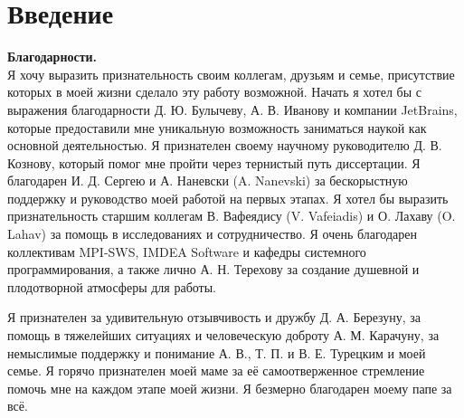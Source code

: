 \chapter*{Введение}							%

\newcommand{\actuality}{{\textbf{\actualityTXT}}}
\newcommand{\progress}{\textbf{\progressTXT}}
\newcommand{\aim}{{\textbf\aimTXT}}
\newcommand{\tasks}{\textbf{\tasksTXT}}
\newcommand{\novelty}{\textbf{\noveltyTXT}}
\newcommand{\influence}{\textbf{\influenceTXT}}
\newcommand{\methods}{\textbf{\methodsTXT}}
\newcommand{\defpositions}{\textbf{\defpositionsTXT}}
\newcommand{\reliability}{\textbf{\reliabilityTXT}}
\newcommand{\probation}{\textbf{\probationTXT}}
\newcommand{\contribution}{\textbf{\contributionTXT}}
\newcommand{\publications}{\textbf{\publicationsTXT}}

\newcommand{\ccite}[1]{\cite{#1}}
\newcommand{\cscite}[1]{~\cite{#1}}


\textbf{Благодарности.} \\
Я хочу выразить признательность своим коллегам, друзьям и семье, присутствие которых
в моей жизни сделало эту работу возможной.
Начать я хотел бы с выражения благодарности Д. Ю. Булычеву, А. В. Иванову и компании JetBrains,
которые предоставили мне уникальную возможность заниматься наукой как основной деятельностью.
Я признателен своему научному руководителю Д. В. Кознову, который помог мне пройти через тернистый путь
диссертации. 
Я благодарен И. Д. Сергею и А. Наневски (A. Nanevski) за бескорыстную поддержку и руководство
моей работой на первых этапах.
Я хотел бы выразить признательность старшим коллегам В. Вафеядису (V. Vafeiadis) и О. Лахаву (O. Lahav)
за помощь в исследованиях и сотрудничество.
Я очень благодарен коллективам MPI-SWS, IMDEA Software и кафедры системного программирования,
а также лично А. Н. Терехову за создание душевной и плодотворной атмосферы для работы.

Я признателен за удивительную отзывчивость и дружбу Д. А. Березуну,
за помощь в тяжелейших ситуациях и человеческую доброту А. М. Карачуну,
за немыслимые поддержку и понимание А. В., Т. П. и В. Е. Турецким и моей семье.
Я горячо признателен моей маме за её самоотверженное стремление помочь мне на каждом этапе моей жизни.
Я безмерно благодарен моему папе за всё.
